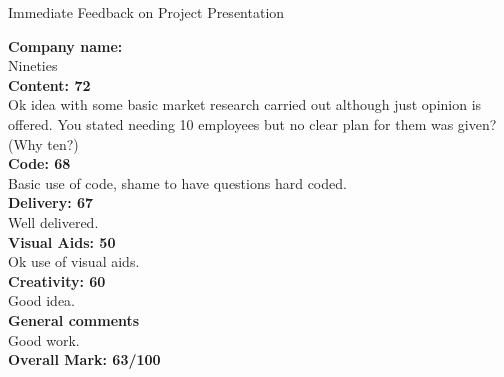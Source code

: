 \documentclass{article}
\begin{document}
\begin{center}
\Huge{Immediate Feedback on Project Presentation}\\
\end{center}


\normalsize
\textbf{Company name:}\\

Nineties\\

\textbf{Content: 72}\\

Ok idea with some basic market research carried out although just opinion is offered.
You stated needing 10 employees but no clear plan for them was given? (Why ten?)\\

\textbf{Code: 68}\\

Basic use of code, shame to have questions hard coded.\\


\textbf{Delivery: 67}\\

Well delivered.\\

\textbf{Visual Aids: 50}\\

Ok use of visual aids.\\

\textbf{Creativity: 60}\\

Good idea.\\

\textbf{General comments}\\

Good work.\\

\textbf{Overall Mark: 63/100}
\end{document}
